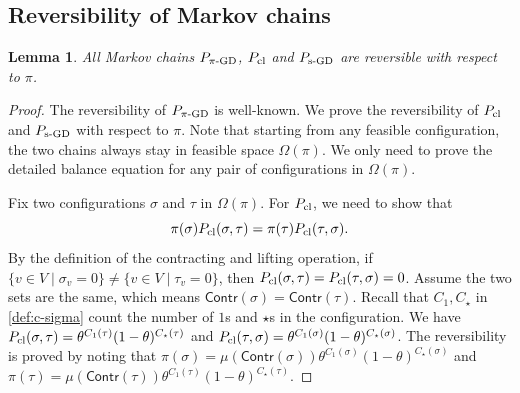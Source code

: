 \documentclass[11pt,a4paper]{article}
\newcommand{\psim}{P_{\textnormal{s-GD}}}
\newtheorem{lemma}[theorem]{Lemma}
\theoremstyle{definition}
\begin{document}
\subsection{Reversibility of Markov chains}\label{sec:proof-reversible}
\begin{lemma}\label{lem:reversible-pcl}
All Markov chains $P_{\pi\textnormal{-GD}}$, $P_{\textnormal{cl}}$ and $\psim$ are reversible with respect to $\pi$.
\end{lemma}
\begin{proof}
The reversibility of $P_{\pi\textnormal{-GD}}$ is well-known. We prove the reversibility of $P_{\textnormal{cl}}$ and $\psim$ with respect to $\pi$.
Note that starting from any feasible configuration, the two chains always stay in feasible space $\Omega(\pi)$. We only need to prove the detailed balance equation for any pair of configurations in $\Omega(\pi)$.

Fix two configurations $\sigma$ and $\tau$ in $\Omega(\pi)$. For $P_{\textnormal{cl}}$, we need to show that 
\[\pi(\sigma) P_{\textnormal{cl}}(\sigma,\tau) = \pi(\tau) P_{\textnormal{cl}}(\tau,\sigma).\]
By the definition of the contracting and lifting operation, if $\{v \in V \mid \sigma_v = 0\} \neq \{v \in V \mid \tau_v = 0\}$, then $P_{\textnormal{cl}}(\sigma,\tau) = P_{\textnormal{cl}}(\tau,\sigma) = 0$. Assume the two sets are the same, which means $\textsf{Contr}(\sigma) = \textsf{Contr}(\tau)$. Recall that $C_1,C_\star$ in \eqref{def:c-sigma} count the number of $1$s and $\star$s in the configuration. We have $P_{\textnormal{cl}}(\sigma,\tau) = \theta^{C_1(\tau)}(1 - \theta)^{C_\star(\tau)}$ and $P_{\textnormal{cl}}(\tau,\sigma) = \theta^{C_1(\sigma)}(1 - \theta)^{C_\star(\sigma)}$. The reversibility is proved by noting that $\pi(\sigma) = \mu(\textsf{Contr}(\sigma))\theta^{C_1(\sigma)}(1 - \theta)^{C_\star(\sigma)}$ and $\pi(\tau) = \mu(\textsf{Contr}(\tau))\theta^{C_1(\tau)}(1 - \theta)^{C_\star(\tau)}$.


\end{proof}
\end{document}
